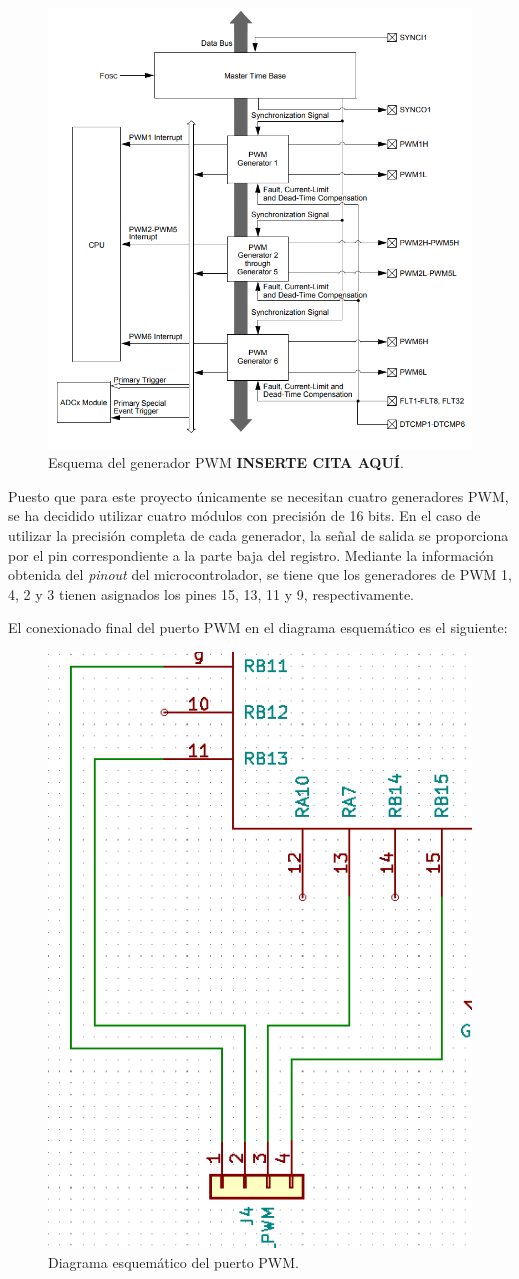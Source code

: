 \begin{itemize}
    \begin{figure}[H]
    \centering 
    \includegraphics[width=.6\linewidth]{pictures/PWMdatasheet.PNG}
    \caption{Esquema del generador PWM \textbf{INSERTE CITA AQUÍ}.}
    \label{fig:CAMBIAR!!!!!!!!!!}
    \end{figure}
    
    Puesto que para este proyecto únicamente se necesitan cuatro generadores PWM, se ha decidido utilizar cuatro módulos con precisión de 16 bits. En el caso de utilizar la precisión completa de cada generador, la señal de salida se proporciona por el pin correspondiente a la parte baja del registro. Mediante la información obtenida del \textit{pinout} del microcontrolador, se tiene que los generadores de PWM 1, 4, 2 y 3 tienen asignados los pines 15, 13, 11 y 9, respectivamente.
    
    El conexionado final del puerto PWM en el diagrama esquemático es el siguiente:
    
    \begin{figure}[H]
    \centering 
    \includegraphics[width=.45\linewidth]{pictures/PWM.PNG}
    \caption{Diagrama esquemático del puerto PWM.}
    \label{fig:CAMBIAR!!!!!!!!!!}
    \end{figure}


\end{itemize}
